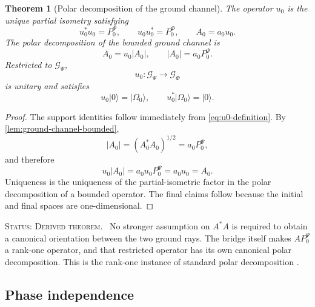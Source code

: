 \documentclass[11pt,reqno]{scrartcl}
\newcommand{\PzeroP}{P_{0}^{\Psi}}
\newcommand{\PzeroF}{P_{0}^{\Phi}}
\newcommand{\GzeroP}{\mathscr G_{\Psi}}
\newcommand{\GzeroF}{\mathscr G_{\Phi}}
\newcommand{\Azero}{A_{0}}
\newcommand{\uzero}{u_{0}}
\newcommand{\ket}[1]{\lvert #1\rangle}
\newcommand{\statuslabel}[1]{\par\smallskip\noindent\textsc{Status: #1.}\ }
\theoremstyle{plain}
\newtheorem{theorem}{Theorem}[section]
\theoremstyle{definition}
\theoremstyle{remark}
\begin{document}
\begin{theorem}[Polar decomposition of the ground channel]
\label{thm:ground-channel-polar}
The operator \(\uzero\) is the unique partial isometry satisfying
\begin{equation}
  \uzero^*\uzero=\PzeroP,
  \qquad
  \uzero\uzero^*=\PzeroF,
  \qquad
  \Azero=a_0\uzero.
  \label{eq:u0-support-identities}
\end{equation}
The polar decomposition of the bounded ground channel is
\begin{equation}
  \boxed{
  \Azero=\uzero|\Azero|,
  \qquad
  |\Azero|=a_0\PzeroP.}
  \label{eq:A0-polar-decomposition}
\end{equation}
Restricted to \(\GzeroP\),
\begin{equation}
  \uzero:\GzeroP\longrightarrow\GzeroF
  \label{eq:u0-ground-unitary}
\end{equation}
is unitary and satisfies
\begin{equation}
  \uzero\ket0=\ket{\Omega_0},
  \qquad
  \uzero^*\ket{\Omega_0}=\ket0.
  \label{eq:u0-ground-actions}
\end{equation}
\end{theorem}

\begin{proof}
The support identities follow immediately from
\eqref{eq:u0-definition}.  By \cref{lem:ground-channel-bounded},
\begin{equation}
  |\Azero|
  =(\Azero^*\Azero)^{1/2}
  =a_0\PzeroP,
\end{equation}
and therefore
\begin{equation}
  \uzero|\Azero|
  =a_0\uzero\PzeroP
  =a_0\uzero
  =\Azero.
\end{equation}
Uniqueness is the uniqueness of the partial-isometric factor in the polar
decomposition of a bounded operator.  The final claims follow because the
initial and final spaces are one-dimensional.
\end{proof}

\statuslabel{Derived theorem} No stronger assumption on \(A^*A\) is required
to obtain a canonical orientation between the two ground rays.  The bridge
itself makes \(A\PzeroP\) a rank-one operator, and that restricted operator
has its own canonical polar decomposition.
This is the rank-one instance of standard polar decomposition
\cite{Kato,ReedSimon}.

\subsection{Phase independence}
\end{document}
